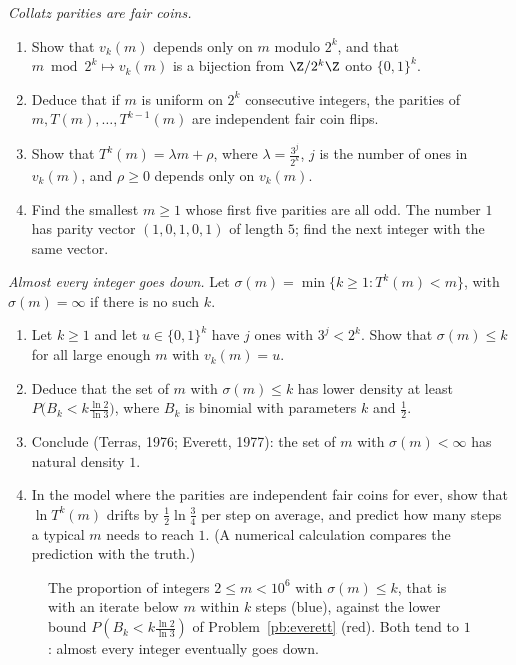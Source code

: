 \begin{exercise}[$\star\star$]\label{pb:terras}
\emph{Collatz parities are fair coins.}
\begin{enumerate}[label=(\alph*)]
\item Show that $v_k(m)$ depends only on $m$ modulo $2^k$, and that $m\bmod2^k\mapsto v_k(m)$ is a bijection from $\Z/2^k\Z$ onto $\{0,1\}^k$.
\item Deduce that if $m$ is uniform on $2^k$ consecutive integers, the parities of $m,T(m),\dots,T^{k-1}(m)$ are independent fair coin
flips.
\item Show that $T^k(m)=\lambda m+\rho$, where $\lambda=\frac{3^j}{2^k}$, $j$ is the number of ones in $v_k(m)$, and $\rho\ge0$ depends only on $v_k(m)$.
\item Find the smallest $m\ge1$ whose first five parities are all odd. The number $1$ has parity vector $(1,0,1,0,1)$ of length $5$; find the
next integer with the same vector.
\end{enumerate}
\end{exercise}

\begin{exercise}[$\star\star\star$]\label{pb:everett}
\emph{Almost every integer goes down.} Let $\sigma(m)=\min\{k\ge1:T^k(m)<m\}$, with $\sigma(m)=\infty$ if there is no such $k$.
\begin{enumerate}[label=(\alph*)]
\item Let $k\ge1$ and let $u\in\{0,1\}^k$ have $j$ ones with $3^j<2^k$. Show that $\sigma(m)\le k$ for all large enough $m$ with $v_k(m)=u$.
\item Deduce that the set of $m$ with $\sigma(m)\le k$ has lower density at least $P\bigl(B_k<k\frac{\ln2}{\ln3}\bigr)$, where $B_k$ is binomial with parameters $k$
and $\frac12$.
\item Conclude (Terras, 1976; Everett, 1977): the set of $m$ with $\sigma(m)<\infty$ has natural density $1$.
\item In the model where the parities are independent fair coins for ever, show that $\ln T^k(m)$ drifts by $\frac12\ln\frac34$ per step on average, and
predict how many steps a typical $m$ needs to reach $1$. (A numerical calculation compares the prediction with the truth.)
\end{enumerate}
\end{exercise}

\begin{figure}[ht]
\centering
{}
\caption{The proportion of integers $2\le m<10^6$ with $\sigma(m)\le k$, that is with an iterate below $m$ within $k$ steps (blue), against the lower bound
$P(B_k<k\frac{\ln2}{\ln3})$ of Problem~\ref{pb:everett} (red). Both tend to $1$: almost every integer eventually goes down.}
\label{fig:collatz}
\end{figure}


